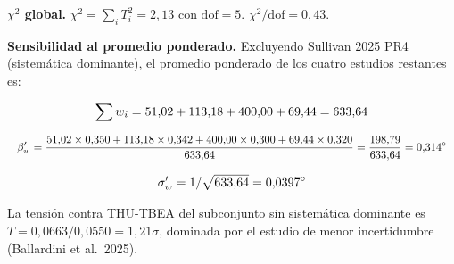 ﻿\documentclass[11pt,letterpaper]{article}
\begin{document}
\begin{table}[htbp]
  \centering
  \small
  \caption{Tensiones con THU-TBEA por estudio isotrópico (recopilación).}
  \label{tab:tension-iso2}
\end{table}

\textbf{$\chi^2$ global.} $\chi^2 = \sum_i T_i^2 = 2{,}13$ con $\mathrm{dof} = 5$. $\chi^2/\mathrm{dof} = 0{,}43$.

\textbf{Sensibilidad al promedio ponderado.} Excluyendo Sullivan 2025 PR4 (sistemática dominante), el promedio ponderado de los cuatro estudios restantes es:

\begin{equation*}
  \resizebox{\ifdim\width>\linewidth \linewidth\else\width\fi}{!}{$\displaystyle \sum w_i = 51{,}02 + 113{,}18 + 400{,}00 + 69{,}44 = 633{,}64$}
\end{equation*}

\begin{equation*}
  \resizebox{\ifdim\width>\linewidth \linewidth\else\width\fi}{!}{$\displaystyle \beta_w' = \frac{51{,}02 \times 0{,}350 + 113{,}18 \times 0{,}342 + 400{,}00 \times 0{,}300 + 69{,}44 \times 0{,}320}{633{,}64} = \frac{198{,}79}{633{,}64} = 0{,}314^\circ$}
\end{equation*}

\begin{equation*}
  \resizebox{\ifdim\width>\linewidth \linewidth\else\width\fi}{!}{$\displaystyle \sigma_w' = 1/\sqrt{633{,}64} = 0{,}0397^\circ$}
\end{equation*}

La tensión contra THU-TBEA del subconjunto sin sistemática dominante es $T = 0{,}0663/0{,}0550 = 1{,}21\sigma$, dominada por el estudio de menor incertidumbre (Ballardini et al.\ 2025).
\end{document}
